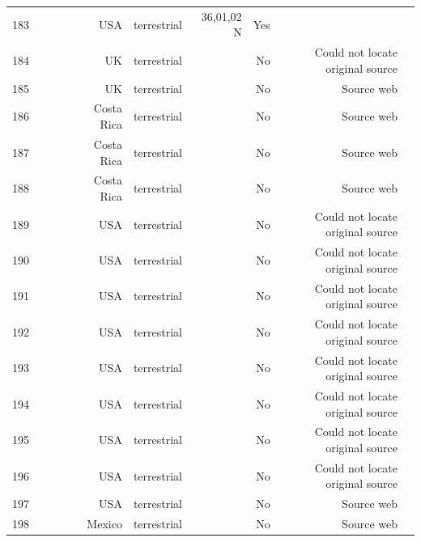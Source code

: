 \documentclass[12pt]{article}
\begin{document}
\begin{landscape}
\begin{table}[h!]
\begin{tabular}{rrrrrrrrr}
      183   & ~\citet{GlobalWeb} & ~\citet{Savely1939} & USA   & terrestrial & 36,01,02 N & Yes   &       &  \\
      184   & ~\citet{GlobalWeb} & ~\citet{Beaver1972} & UK    & terrestrial &       & No    & Could not locate original source &  \\
      185   & ~\citet{GlobalWeb} & ~\citet{Chapman1955} & UK    & terrestrial &       & No    & Source web &  \\
      186   & ~\citet{GlobalWeb} & ~\citet{Cornaby1974} & Costa Rica & terrestrial &       & No    & Source web &  \\
      187   & ~\citet{GlobalWeb} & ~\citet{Cornaby1974} & Costa Rica & terrestrial &       & No    & Source web &  \\
      188   & ~\citet{GlobalWeb} & ~\citet{Jiron1981} & Costa Rica & terrestrial &       & No    & Source web &  \\
      189   & ~\citet{GlobalWeb} & ~\citet{McKinnerney1978} & USA   & terrestrial &       & No    & Could not locate original source &  \\
      190   & ~\citet{GlobalWeb} & ~\citet{McKinnerney1978} & USA   & terrestrial &       & No    & Could not locate original source &  \\
      191   & ~\citet{GlobalWeb} & ~\citet{McKinnerney1978} & USA   & terrestrial &       & No    & Could not locate original source &  \\
      192   & ~\citet{GlobalWeb} & ~\citet{McKinnerney1978} & USA   & terrestrial &       & No    & Could not locate original source &  \\
      193   & ~\citet{GlobalWeb} & ~\citet{McKinnerney1978} & USA   & terrestrial &       & No    & Could not locate original source &  \\
      194   & ~\citet{GlobalWeb} & ~\citet{McKinnerney1978} & USA   & terrestrial &       & No    & Could not locate original source &  \\
      195   & ~\citet{GlobalWeb} & ~\citet{Schoenly1983a} & USA   & terrestrial &       & No    & Could not locate original source &  \\
      196   & ~\citet{GlobalWeb} & ~\citet{Schoenly1983a} & USA   & terrestrial &       & No    & Could not locate original source &  \\
      197   & ~\citet{GlobalWeb} & ~\citet{Mohr1943} & USA   & terrestrial &       & No    & Source web &  \\
      198   & ~\citet{GlobalWeb} & ~\citet{Schoenly1983} & Mexico & terrestrial &       & No    & Source web &  \\

\end{tabular}
\end{table}
\end{landscape}
\end{document}
